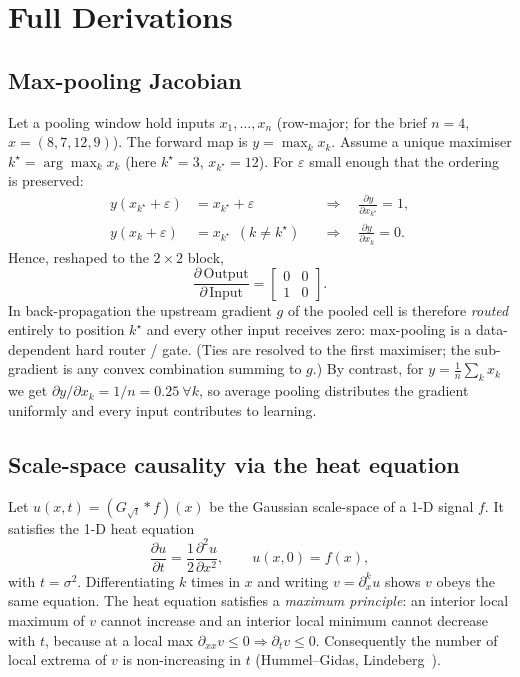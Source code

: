 \section{Full Derivations}
\label{app:deriv}

\subsection{Max-pooling Jacobian}
\label{app:maxpool}
Let a pooling window hold inputs $x_1,\dots,x_n$ (row-major; for the brief
$n=4$, $x=(8,7,12,9)$). The forward map is $y=\max_k x_k$. Assume a unique
maximiser $k^\star=\arg\max_k x_k$ (here $k^\star=3$, $x_{k^\star}=12$). For
$\varepsilon$ small enough that the ordering is preserved:
\begin{align}
  y(x_{k^\star}+\varepsilon) &= x_{k^\star}+\varepsilon
    &&\Rightarrow\quad \frac{\partial y}{\partial x_{k^\star}} = 1, \\
  y(x_{k}+\varepsilon) &= x_{k^\star} \ \ (k\neq k^\star)
    &&\Rightarrow\quad \frac{\partial y}{\partial x_{k}} = 0 .
\end{align}
Hence, reshaped to the $2\times2$ block,
\begin{equation}
  \frac{\partial\,\text{Output}}{\partial\,\text{Input}}
  = \begin{bmatrix} 0 & 0 \\ 1 & 0 \end{bmatrix}.
\end{equation}
In back-propagation the upstream gradient $g$ of the pooled cell is therefore
\emph{routed} entirely to position $k^\star$ and every other input receives
zero: max-pooling is a data-dependent hard router / gate. (Ties are resolved to
the first maximiser; the sub-gradient is any convex combination summing to
$g$.) By contrast, for $y=\frac1n\sum_k x_k$ we get
$\partial y/\partial x_k = 1/n = 0.25\ \forall k$, so average pooling
distributes the gradient uniformly and every input contributes to learning.

\subsection{Scale-space causality via the heat equation}
\label{app:causality}
Let $u(x,t) = (G_{\sqrt{t}} * f)(x)$ be the Gaussian scale-space of a 1-D
signal $f$. It satisfies the 1-D heat equation
\begin{equation}
  \frac{\partial u}{\partial t} = \frac12 \frac{\partial^2 u}{\partial x^2},
  \qquad u(x,0)=f(x),
\end{equation}
with $t=\sigma^2$. Differentiating $k$ times in $x$ and writing
$v=\partial_x^k u$ shows $v$ obeys the same equation. The heat equation
satisfies a \emph{maximum principle}: an interior local maximum of $v$ cannot
increase and an interior local minimum cannot decrease with $t$, because at a
local max $\partial_{xx} v \le 0 \Rightarrow \partial_t v \le 0$. Consequently
the number of local extrema of $v$ is non-increasing in $t$
(Hummel--Gidas, Lindeberg~\cite{lindeberg1994}).

